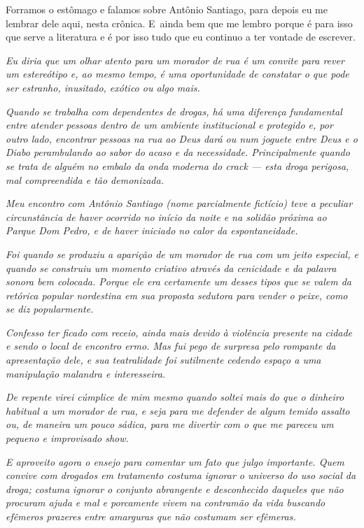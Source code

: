 Forramos o estômago e falamos sobre Antônio Santiago, para depois eu me
lembrar dele aqui, nesta crônica. E~ainda bem que me lembro porque é
para isso que serve a literatura e é por isso tudo que eu continuo a ter
vontade de escrever.

\begin{center}\asterisc{}\end{center}
\begingroup\small

\emph{Eu diria que um olhar atento para um morador de rua é um convite
para rever um estereótipo e, ao mesmo tempo, é uma oportunidade de
constatar o que pode ser estranho, inusitado, exótico ou algo mais.}

\emph{Quando se trabalha com dependentes de drogas, há uma diferença
fundamental entre atender pessoas dentro de um ambiente institucional e
protegido e, por outro lado, encontrar pessoas na rua ao Deus dará ou
num joguete entre Deus e o Diabo perambulando ao sabor do acaso e da
necessidade. Principalmente quando se trata de alguém no embalo da onda
moderna do crack --- esta droga perigosa, mal compreendida e tão
demonizada.}

\emph{Meu encontro com Antônio Santiago (nome parcialmente fictício)
teve a peculiar circunstância de haver ocorrido no início da noite e na
solidão próxima ao Parque Dom Pedro, e de haver iniciado no calor da
espontaneidade.}

\emph{Foi quando se produziu a aparição de um morador de rua com um
jeito especial, e quando se construiu um momento criativo através da
cenicidade e da palavra sonora bem colocada. Porque ele era certamente
um desses tipos que se valem da retórica popular nordestina em sua
proposta sedutora para vender o peixe, como se diz popularmente.}

\emph{Confesso ter ficado com receio, ainda mais devido à violência
presente na cidade e sendo o local de encontro ermo. Mas fui pego de
surpresa pelo rompante da apresentação dele, e sua teatralidade foi
sutilmente cedendo espaço a uma manipulação malandra e interesseira.}

\emph{De repente virei cúmplice de mim mesmo quando soltei mais do que o
dinheiro habitual a um morador de rua, e seja para me defender de algum
temido assalto ou, de maneira um pouco sádica, para me divertir com o
que me pareceu um pequeno e improvisado show.}

\emph{E aproveito agora o ensejo para comentar um fato que julgo
importante. Quem convive com drogados em tratamento costuma ignorar o
universo do uso social da droga; costuma ignorar o conjunto abrangente e
desconhecido daqueles que não procuram ajuda e mal e porcamente vivem na
contramão da vida buscando efêmeros prazeres entre amarguras que não
costumam ser efêmeras.}

